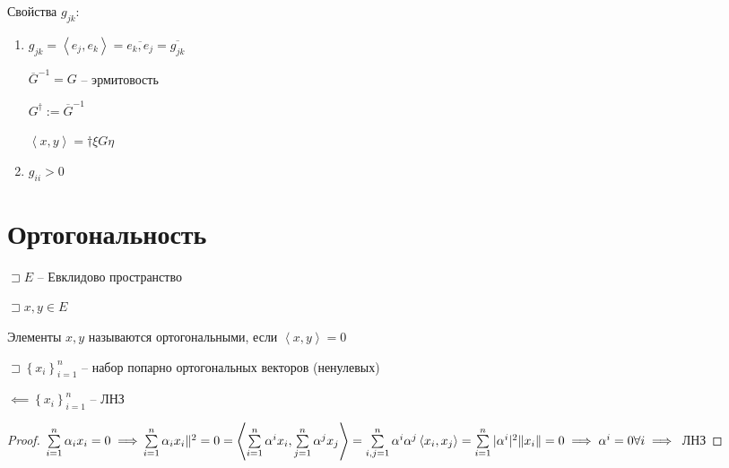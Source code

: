 \documentclass{book}
\newcommand{\ov}[1]{\overline{#1}}
\theoremstyle{definition}
\begin{document}
 Свойства $g_{jk}$:
  \begin{enumerate}
      \item $g_{jk} = \left<e_j, e_k \right> = \ov{e_k, e_j} = \ov{g_{jk}}$ 

          $\ov G^{-1} = G$ -- эрмитовость

          $G^{\dag} := \ov G^{-1}$

          $\left<x, y \right> = \dag {\xi} G \eta$
      \item $g_{ii} > 0$
 \end{enumerate}

 \section{Ортогональность}

 $\sqsupset E$ -- Евклидово пространство

 $\sqsupset x, y\in E$

 \begin{definition}
     Элементы $x, y$ называются ортогональными, если  $\left<x, y \right> = 0$
 \end{definition}

 \begin{lemma}
     $\sqsupset \left\{ x_i \right\} _{i=1}^n$ -- набор попарно ортогональных векторов (ненулевых)

     $\impliedby \left\{ x_i \right\} _{i=1}^n$ -- ЛНЗ
 \end{lemma}
 \begin{proof}
     $\sum_{i=1}^{n} \alpha_i x_i = 0 \implies \\\sum_{i=1}^{n} \alpha_ix_i\|^2 = 0 = \left<\sum_{i=1}^{n} \alpha^ix_i, \sum_{j=1}^{n} \alpha^jx_j \right> = \sum_{i, j = 1}^{n} \alpha^i\alpha^j \left<x_i, x_j \right> = \sum_{i=1}^{n} |\alpha^i|^2\|x_i\| = 0 \implies \alpha^i = 0 \forall i \implies $ ЛНЗ
 \end{proof}
\end{document}
